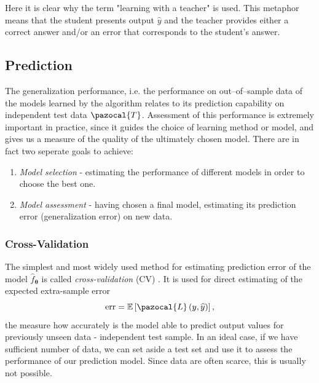 Here it is clear why the term "learning with a teacher" is used. This metaphor means that the student presents output $\widehat{y}$  and the teacher provides either a correct answer and/or an error that corresponds to the student's answer. 

\subsection{Prediction}
The generalization performance, i.e. the performance on out--of--sample data of the models learned by the algorithm relates to its prediction capability on independent test data $\pazocal{T}$. Assessment of this performance is extremely important in practice, since it guides the choice of learning
method or model, and gives us a measure of the quality of the ultimately
chosen model. There are in fact two seperate goals to achieve:
\begin{enumerate}
    \item \emph{Model selection} - estimating the performance of different models in order
to choose the best one.
    \item \emph{Model assessment} - having chosen a final model, estimating its prediction
error (generalization error) on new data.
\end{enumerate}
\subsubsection{Cross-Validation}
The simplest and most widely used method for estimating prediction error of  the model $\hat{f}_{\boldsymbol{\theta}}$ is called \emph{cross-validation} (CV) \cite{statistics}. It is used for direct estimating of the expected extra-sample error
\begin{equation}
\mathrm{err} = \E\left[\pazocal{L}\left(y, \widehat{y}\right)\right],
\end{equation}
the measure how accurately is the model able to predict output values for previously unseen data - independent test sample. In an ideal case, if we have sufficient number of data, we can set aside a test set and use
it to assess the performance of our prediction model. Since data are often
scarce, this is usually not possible.


